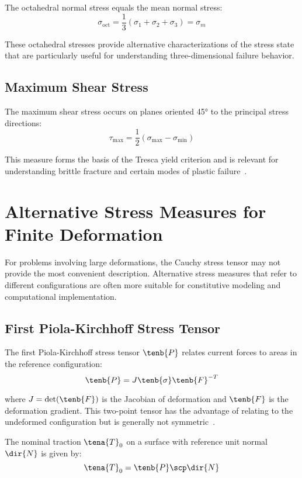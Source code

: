The octahedral normal stress equals the mean normal stress:
\begin{equation}
\sigma_{\text{oct}} = \frac{1}{3}(\sigma_1 + \sigma_2 + \sigma_3) = \sigma_m
\end{equation}

These octahedral stresses provide alternative characterizations of the stress state that are particularly useful for understanding three-dimensional failure behavior.

\subsection{Maximum Shear Stress}
The maximum shear stress occurs on planes oriented 45° to the principal stress directions:
\begin{equation}
\tau_{\text{max}} = \frac{1}{2}(\sigma_{\text{max}} - \sigma_{\text{min}})
\end{equation}

This measure forms the basis of the Tresca yield criterion and is relevant for understanding brittle fracture and certain modes of plastic failure~\autocite{Sadd.2019}.

\section{Alternative Stress Measures for Finite Deformation}

For problems involving large deformations, the Cauchy stress tensor may not provide the most convenient description. Alternative stress measures that refer to different configurations are often more suitable for constitutive modeling and computational implementation.

\subsection{First Piola-Kirchhoff Stress Tensor}
The first Piola-Kirchhoff stress tensor $\tenb{P}$ relates current forces to areas in the reference configuration:
\begin{equation}
\tenb{P} = J\tenb{\sigma}\tenb{F}^{-T}
\end{equation}

where $J = \det(\tenb{F})$ is the Jacobian of deformation and $\tenb{F}$ is the deformation gradient. This two-point tensor has the advantage of relating to the undeformed configuration but is generally not symmetric~\autocite{Sadd.2019}.

The nominal traction $\tena{T}_0$ on a surface with reference unit normal $\dir{N}$ is given by:
\begin{equation}
\tena{T}_0 = \tenb{P} \scp \dir{N}
\end{equation}

